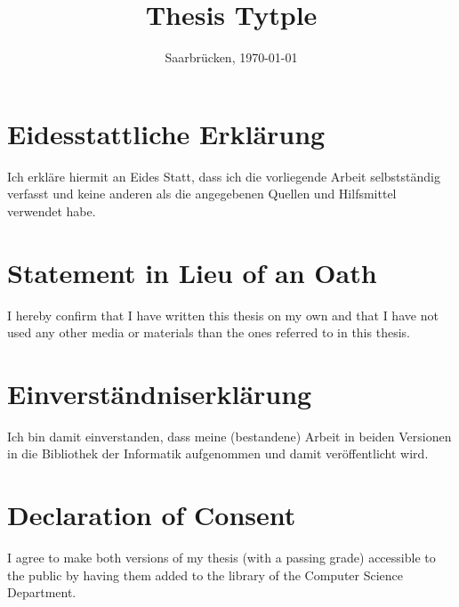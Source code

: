 \documentclass[11pt, a4paper, twoside]{Thesis}
\begin{document}

\frontmatter

\title  {Thesis Tytple }

\addresses  {\groupname\\\deptname\\\univname}  %
\date       {Saarbr\"ucken, \today }
\subject    {}
\keywords   {}

\maketitle



\thispagestyle{empty}

\section*{Eidesstattliche Erkl\"{a}rung}
Ich erkl\"{a}re hiermit an Eides Statt, dass ich die vorliegende Arbeit selbstst\"{a}ndig verfasst und keine
anderen als die angegebenen Quellen und Hilfsmittel verwendet habe.

\vspace{0.60cm}
\section*{Statement in Lieu of an Oath}
I hereby confirm that I have written this thesis on my own and that I have not used any other media or
materials than the ones referred to in this thesis.
\vspace{1.5cm}

\section*{Einverst\"{a}ndniserkl\"{a}rung}
Ich bin damit einverstanden, dass meine (bestandene) Arbeit in beiden Versionen in die Bibliothek der
Informatik aufgenommen und damit ver\"{o}ffentlicht wird.

\vspace{0.60cm}
\section*{Declaration of Consent}
I agree to make both versions of my thesis (with a passing grade) accessible to the public by having
them added to the library of the Computer Science Department.
\vspace{3cm}
\end{document}

